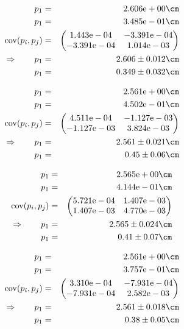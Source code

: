 \begin{eqnarray}
    p_1 &=& 2.606\mathrm{e}+00 \cm \nonumber \\
    p_1 &=& 3.485\mathrm{e}-01 \cm \nonumber \\
    \mathrm{cov}(p_i, p_j) &=& 
    \begin{pmatrix}
        1.443\mathrm{e}-04 &-3.391\mathrm{e}-04 \\
        -3.391\mathrm{e}-04 &1.014\mathrm{e}-03 \\
    \end{pmatrix}
\\ \Rightarrow \qquad
    p_1 &=& 2.606 \pm 0.012 \cm\\
    p_1 &=& 0.349 \pm 0.032 \cm
\end{eqnarray}

\begin{eqnarray}
    p_1 &=& 2.561\mathrm{e}+00 \cm \nonumber \\
    p_1 &=& 4.502\mathrm{e}-01 \cm \nonumber \\
    \mathrm{cov}(p_i, p_j) &=& 
    \begin{pmatrix}
        4.511\mathrm{e}-04 &-1.127\mathrm{e}-03 \\
        -1.127\mathrm{e}-03 &3.824\mathrm{e}-03 \\
    \end{pmatrix}
\\ \Rightarrow \qquad
    p_1 &=& 2.561 \pm 0.021 \cm\\
    p_1 &=& 0.45 \pm 0.06 \cm
\end{eqnarray}

\begin{eqnarray}
    p_1 &=& 2.565\mathrm{e}+00 \cm \nonumber \\
    p_1 &=& 4.144\mathrm{e}-01 \cm \nonumber \\
    \mathrm{cov}(p_i, p_j) &=& 
    \begin{pmatrix}
        5.721\mathrm{e}-04 &1.407\mathrm{e}-03 \\
        1.407\mathrm{e}-03 &4.770\mathrm{e}-03 \\
    \end{pmatrix}
\\ \Rightarrow \qquad
    p_1 &=& 2.565 \pm 0.024 \cm\\
    p_1 &=& 0.41 \pm 0.07 \cm
\end{eqnarray}

\begin{eqnarray}
    p_1 &=& 2.561\mathrm{e}+00 \cm \nonumber \\
    p_1 &=& 3.757\mathrm{e}-01 \cm \nonumber \\
    \mathrm{cov}(p_i, p_j) &=& 
    \begin{pmatrix}
        3.310\mathrm{e}-04 &-7.931\mathrm{e}-04 \\
        -7.931\mathrm{e}-04 &2.582\mathrm{e}-03 \\
    \end{pmatrix}
\\ \Rightarrow \qquad
    p_1 &=& 2.561 \pm 0.018 \cm\\
    p_1 &=& 0.38 \pm 0.05 \cm
\end{eqnarray}

